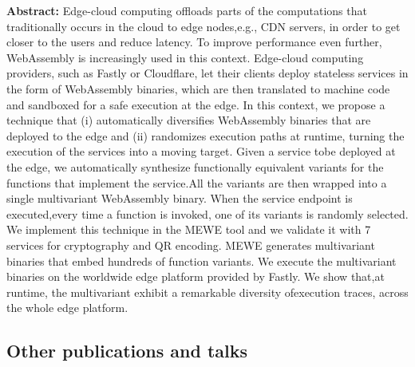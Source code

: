 \begin{enumerate}[label=\subscript{P}{{\arabic*}}]
    {\small
    \textbf{Abstract:} Edge-cloud computing offloads parts of the computations that traditionally occurs in the cloud to edge nodes,e.g., CDN servers, in order to get closer to the users and reduce latency. To improve performance even further, WebAssembly is increasingly used in this context. Edge-cloud computing providers, such as Fastly or Cloudflare, let their clients deploy stateless services in the form of WebAssembly binaries, which are then translated to machine code and sandboxed for a safe execution at the edge.
    In this context, we propose a technique that (i) automatically diversifies WebAssembly binaries that are deployed to the edge and (ii) randomizes execution paths at runtime, turning the execution of the services into a moving target. Given a service tobe deployed at the edge, we automatically synthesize functionally equivalent variants for the functions that implement the service.All the variants are then wrapped into a single multivariant WebAssembly binary. When the service endpoint is executed,every time a function is invoked, one of its variants is randomly selected. We implement this technique in the MEWE tool and we validate it with 7 services for cryptography and QR encoding. MEWE generates multivariant binaries that embed hundreds of function variants. We execute the multivariant binaries on the worldwide edge platform provided by Fastly. We show that,at runtime, the multivariant exhibit a remarkable diversity ofexecution traces, across the whole edge platform. }
\end{enumerate}

\subsection*{Other publications and talks}


